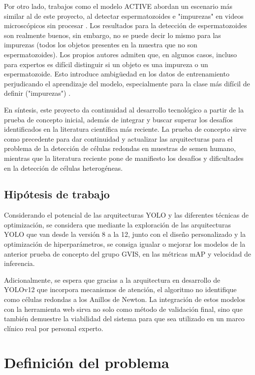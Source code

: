 \documentclass[12pt,a4paper,onecolumn,oneside]{report}
\begin{document}
Por otro lado, trabajos como el modelo ACTIVE abordan un escenario más similar al de este proyecto, al detectar espermatozoides e "impurezas" en videos microscópicos sin procesar \cite{chen2024}. Los resultados para la detección de espermatozoides son realmente buenos, sin embargo, no se puede decir lo mismo
para las impurezas (todos los objetos presentes en la muestra que no son espermatozoides). Los propios autores admiten que, en algunos casos, incluso para expertos es difícil distinguir si un objeto
es una impureza o un espermatozoide. Esto introduce ambigüedad en los datos de entrenamiento perjudicando el aprendizaje del modelo, especialmente para la clase más difícil de definir ("impurezas") \cite{chen2024}.

En síntesis, este proyecto da continuidad al desarrollo tecnológico a partir de la prueba de concepto inicial, además de integrar y buscar superar los desafíos identificados en la literatura científica más reciente. La prueba de concepto sirve como precedente para dar continuidad y actualizar las 
arquitecturas para el problema de la detección de células redondas en muestras de semen humano, mientras que la literatura reciente pone de manifiesto los desafíos y dificultades en la detección de células heterogéneas. 


\subsection{Hipótesis de trabajo}

Considerando el potencial de las arquitecturas YOLO y las diferentes técnicas de optimización, se considera que mediante la exploración de las arquitecturas YOLO que van desde la versión 8 a la 12, 
junto con el diseño personalizado y la optimización de hiperparámetros, se consiga igualar o mejorar los modelos de la anterior prueba de concepto del grupo GVIS, 
en las métricas mAP y velocidad de inferencia. 

Adicionalmente, se espera que gracias a la arquitectura en desarrollo de YOLOv12 que incorpora mecanismos de atención, el algoritmo no identifique 
como células redondas a los Anillos de Newton. La integración de estos modelos con la herramienta web sirva no solo como método de validación final, sino que también demuestre la viabilidad del sistema 
para que sea utilizado en un marco clínico real por personal experto.

\section{Definición del problema}
\label{sec:Definición del problema}
\end{document}
